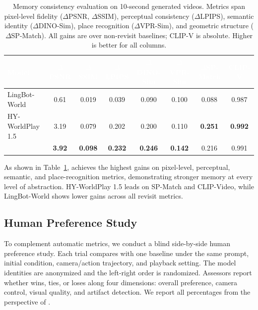 \begin{table}[H]
\caption{Memory consistency evaluation on 10-second generated videos.
Metrics span pixel-level fidelity ($\Delta$PSNR, $\Delta$SSIM),
perceptual consistency ($\Delta$LPIPS),
semantic identity ($\Delta$DINO-Sim),
place recognition ($\Delta$VPR-Sim),
and geometric structure ($\Delta$SP-Match).
All gains are over non-revisit baselines; CLIP-V is absolute.
Higher is better for all columns.}
\label{tab:memory-consistency}
\centering
\renewcommand{\arraystretch}{1.1}
\setlength{\tabcolsep}{3.5pt}
\footnotesize
\begin{tabular}{@{}lccccccc@{}}
\toprule
\rowcolor{amapblue}
\textcolor{white}{\textbf{Model}} &
\textcolor{white}{$\Delta$\textbf{PSNR}} &
\textcolor{white}{$\Delta$\textbf{SSIM}} &
\textcolor{white}{$\Delta$\textbf{LPIPS}} &
\textcolor{white}{$\Delta$\textbf{DINO-Sim}} &
\textcolor{white}{$\Delta$\textbf{VPR-Sim}} &
\textcolor{white}{$\Delta$\textbf{SP-Match}} &
\textcolor{white}{\textbf{CLIP-V}} \\
\midrule
\rowcolor{TableRowAlt}
LingBot-World & 0.61 & 0.019 & 0.039 & 0.090 & 0.100 & 0.088 & 0.987 \\
HY-WorldPlay 1.5 & 3.19 & 0.079 & 0.202 & 0.200 & 0.110 & \textbf{0.251} & \textbf{0.992} \\
\midrule
\rowcolor{TableRowAlt}
\textbf{\evalmodel{}} & \textbf{3.92} & \textbf{0.098} & \textbf{0.232} & \textbf{0.246} & \textbf{0.142} & 0.216 & 0.991 \\
\bottomrule
\end{tabular}
\end{table}

As shown in Table~\ref{tab:memory-consistency},
\evalmodel{} achieves the highest gains on pixel-level, perceptual,
semantic, and place-recognition metrics,
demonstrating stronger memory at every level of abstraction.
HY-WorldPlay 1.5 leads on SP-Match and CLIP-Video,
while LingBot-World shows lower gains across all revisit metrics.

\subsection{Human Preference Study}
\label{sec:user-study}

To complement automatic metrics, we conduct a blind side-by-side human
preference study. Each trial compares \evalmodel{} with one baseline under the
same prompt, initial condition, camera/action trajectory, and playback setting.
The model identities are anonymized and the left-right order is randomized.
Assessors report whether \evalmodel{} wins, ties, or loses along four dimensions:
overall preference, camera control, visual quality, and artifact detection. We
report all percentages from the perspective of \evalmodel{}.

